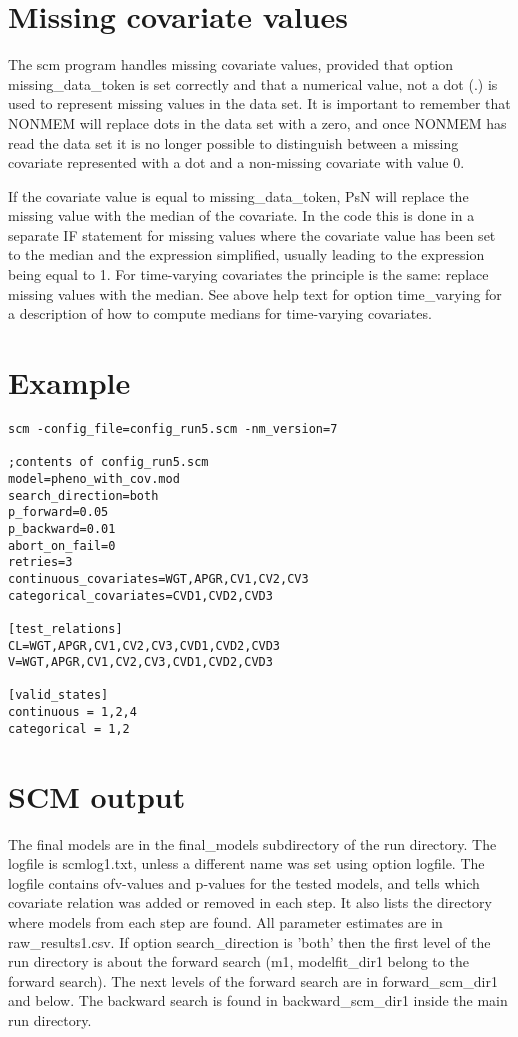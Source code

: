 \section{Missing covariate values}
The scm program handles missing covariate values, provided that option missing\_data\_token is set correctly and that a numerical value, not a dot (.) is
used to represent missing values in the data set. It is important to remember that NONMEM will replace dots in the data set with a zero, and once NONMEM
has read the data set it is no longer possible to distinguish between
a missing covariate represented with a dot and a 
non-missing covariate with value 0. 

If the covariate value is equal to missing\_data\_token, PsN will replace the missing value with the median of the covariate. In the code this is done in a separate IF statement for missing values where the covariate value has been set to the median and the expression simplified, usually leading to the expression being equal to 1. For time-varying covariates the principle is the same: replace missing values with the median. See above help text for option time\_varying for a description of how to compute medians for time-varying covariates.  

\section{Example}
\begin{verbatim}
scm -config_file=config_run5.scm -nm_version=7

;contents of config_run5.scm
model=pheno_with_cov.mod
search_direction=both
p_forward=0.05
p_backward=0.01
abort_on_fail=0
retries=3
continuous_covariates=WGT,APGR,CV1,CV2,CV3
categorical_covariates=CVD1,CVD2,CVD3

[test_relations]
CL=WGT,APGR,CV1,CV2,CV3,CVD1,CVD2,CVD3
V=WGT,APGR,CV1,CV2,CV3,CVD1,CVD2,CVD3

[valid_states]
continuous = 1,2,4
categorical = 1,2
\end{verbatim}

\section{SCM output}
The final models are in the final\_models subdirectory of the run directory. The logfile is scmlog1.txt, unless a different name was set using option logfile. The logfile contains ofv-values and p-values for the tested models, and tells which covariate relation was added or removed in each step. It also lists the directory where models from each step are found. All parameter estimates are in raw\_results1.csv. If option search\_direction is 'both' then the first level of the run directory is about the forward search (m1, modelfit\_dir1 belong to the forward search). The next levels of the forward search are in forward\_scm\_dir1 and below. The backward search is found in backward\_scm\_dir1 inside the main run directory.  


